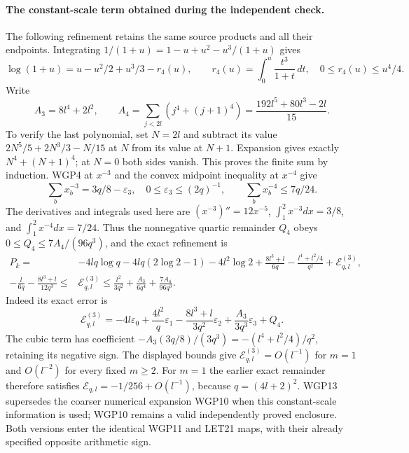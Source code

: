 \documentclass[11pt,a4paper]{article}
\begin{document}
\paragraph{The constant-scale term obtained during the independent check.}
The following refinement retains the same source products and all their
endpoints. Integrating $1/(1+u)=1-u+u^2-u^3/(1+u)$ gives
\[
 \log(1+u)=u-u^2/2+u^3/3-r_4(u),\qquad
 r_4(u)=\int_0^u\frac{t^3}{1+t}\,dt,\quad0\le r_4(u)\le u^4/4.
\]
Write
\[
 A_3=8l^4+2l^2,\qquad
 A_4=\sum_{j<2l}(j^4+(j+1)^4)=\frac{192l^5+80l^3-2l}{15}.
 \tag{WGP12}
\]
To verify the last polynomial, set $N=2l$ and subtract its value
$2N^5/5+2N^3/3-N/15$ at $N$ from its value at $N+1$.
Expansion gives exactly $N^4+(N+1)^4$; at $N=0$ both sides vanish.
This proves the finite sum by induction. WGP4 at $x^{-3}$ and
the convex midpoint inequality at $x^{-4}$ give
\[
 \sum_bx_b^{-3}=3q/8-\varepsilon_3,\quad
 0\le\varepsilon_3\le(2q)^{-1},\qquad
 \sum_bx_b^{-4}\le7q/24.
\]
The derivatives and integrals used here are $(x^{-3})''=12x^{-5}$,
$\int_1^2x^{-3}dx=3/8$, and $\int_1^2x^{-4}dx=7/24$.
Thus the nonnegative quartic remainder $Q_4$ obeys
$0\le Q_4\le7A_4/(96q^3)$, and the exact refinement is
\[
 \boxed{\begin{aligned}
 P_k={}&-4lq\log q-4lq(2\log2-1)-4l^2\log2
       +\frac{8l^3+l}{6q}-\frac{l^4+l^2/4}{q^2}
       +\mathcal E^{(3)}_{q,l},\\
 -\frac l{6q}-\frac{8l^3+l}{12q^3}
 \le{}&\mathcal E^{(3)}_{q,l}\le
 \frac{l^2}{3q^2}+\frac{A_3}{6q^4}+\frac{7A_4}{96q^3}.
 \end{aligned}}\tag{WGP13}
\]
Indeed its exact error is
\[
 \mathcal E^{(3)}_{q,l}=-4l\varepsilon_0
 +\frac{4l^2}{q}\varepsilon_1
 -\frac{8l^3+l}{3q^2}\varepsilon_2
 +\frac{A_3}{3q^3}\varepsilon_3+Q_4.
 \tag{WGP14}
\]
The cubic term has coefficient $-A_3(3q/8)/(3q^3)
=-(l^4+l^2/4)/q^2$, retaining its negative sign.
The displayed bounds give $\mathcal E^{(3)}_{q,l}=O(l^{-1})$
for $m=1$ and $O(l^{-2})$ for every fixed $m\ge2$.
For $m=1$ the earlier exact remainder therefore satisfies
$\mathcal E_{q,l}=-1/256+O(l^{-1})$, because $q=(4l+2)^2$.
WGP13 supersedes the coarser numerical expansion WGP10 when this
constant-scale information is used; WGP10 remains a valid independently
proved enclosure. Both versions enter the identical WGP11 and LET21
maps, with their already specified opposite arithmetic sign.



\end{document}
